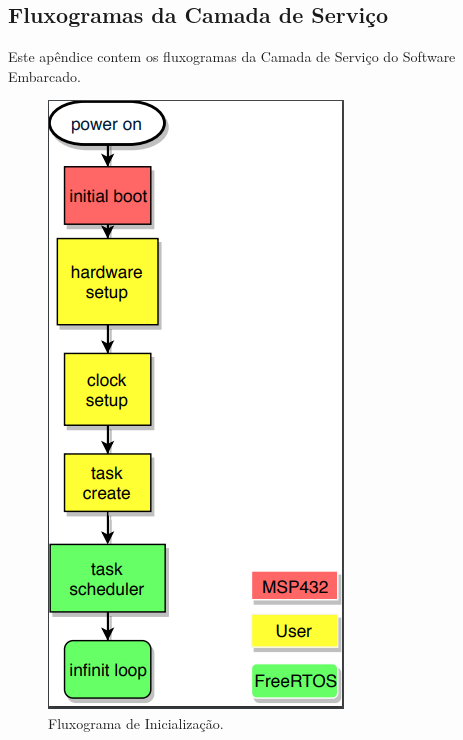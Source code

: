 \begin{apendicesenv}
\chapter{Fluxogramas da Camada de Serviço}
\label{apendicef}

Este apêndice contem os fluxogramas da Camada de Serviço do Software Embarcado.

\begin{figure}[!h]
	\centerfloat
	\centering
	\includegraphics[keepaspectratio=true,scale=0.65]{figuras/flowChart_obc.PNG}
	\caption{Fluxograma de Inicialização.}
	\label{flowChart_obc}
\end{figure}


\end{apendicesenv}
